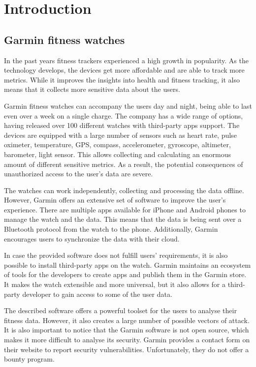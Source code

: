 \chapter{Introduction}


\section{Garmin fitness watches}

In the past years fitness trackers experienced a high growth in popularity.
As the technology develops, the devices get more affordable and are able to track more metrics.
While it improves the insights into health and fitness tracking, it also means that it collects more sensitive data about the users.

Garmin fitness watches can accompany the users day and night, being able to last even over a week on a single charge.
The company has a wide range of options, having released over 100 different watches with third-party apps support\cite{garmin-connect-iq-devices}.
The devices are equipped with a large number of sensors such as heart rate, pulse oximeter, temperature, GPS, compass, accelerometer, gyroscope, altimeter, barometer, light sensor.
This allows collecting and calculating an enormous amount of different sensitive metrics.
As a result, the potential consequences of unauthorized access to the user's data are severe.

The watches can work independently, collecting and processing the data offline.
However, Garmin offers an extensive set of software to improve the user's experience.
There are multiple apps available for iPhone and Android phones to manage the watch and the data.
This means that the data is being sent over a Bluetooth protocol from the watch to the phone.
Additionally, Garmin encourages users to synchronize the data with their cloud.

In case the provided software does not fulfill users' requirements, it is also possible to install third-party apps on the watch.
Garmin maintains an ecosystem of tools for the developers to create apps and publish them in the Garmin store.
It makes the watch extensible and more universal, but it also allows for a third-party developer to gain access to some of the user data.

The described software offers a powerful toolset for the users to analyse their fitness data.
However, it also creates a large number of possible vectors of attack.
It is also important to notice that the Garmin software is not open source, which makes it more difficult to analyse its security.
Garmin provides a contact form on their website to report security vulnerabilities.
Unfortunately, they do not offer a bounty program.

